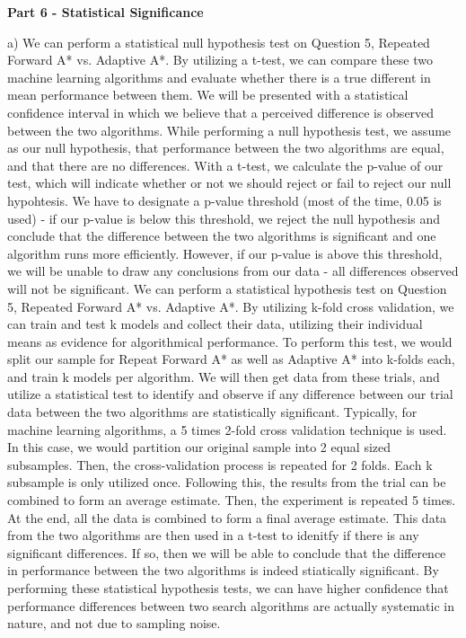 \documentclass[11pt]{article}
\begin{document}
    
    \begin{center}
        \Large
        \textbf{Part 6 - Statistical Significance}
    \end{center}
    a) 
    We can perform a statistical null hypothesis test on Question 5, Repeated Forward A* vs. Adaptive A*. By utilizing a t-test, we can compare these two machine learning algorithms and evaluate whether there is a true different in mean performance between them. We will be presented with a statistical confidence interval in which we believe that a perceived difference is observed between the two algorithms. While performing a null hypothesis test, we assume as our null hypothesis, that performance between the two algorithms are equal, and that there are no differences. With a t-test, we calculate the p-value of our test, which will indicate whether or not we should reject or fail to reject our null hypohtesis. We have to designate a p-value threshold (most of the time, 0.05 is used) - if our p-value is below this threshold, we reject the null hypothesis and conclude that the difference between the two algorithms is significant and one algorithm runs more efficiently. However, if our p-value is above this threshold, we will be unable to draw any conclusions from our data - all differences observed will not be significant. 
    We can perform a statistical hypothesis test on Question 5, Repeated Forward A* vs. Adaptive A*. By utilizing k-fold cross validation, we can train and test k models and collect their data, utilizing their individual means as evidence for algorithmical performance. To perform this test, we would split our sample for Repeat Forward A* as well as Adaptive A* into k-folds each, and train k models per algorithm. We will then get data from these trials, and utilize a statistical test to identify and observe if any difference between our trial data between the two algorithms are statistically significant. Typically, for machine learning algorithms, a 5 times 2-fold cross validation technique is used. In this case, we would partition our original sample into 2 equal sized subsamples. Then, the cross-validation process is repeated for 2 folds. Each k subsample is only utilized once. Following this, the results from the trial can be combined to form an average estimate. Then, the experiment is repeated 5 times. At the end, all the data is combined to form a final average estimate. This data from the two algorithms are then used in a t-test to idenitfy if there is any significant differences. If so, then we will be able to conclude that the difference in performance between the two algorithms is indeed stiatically significant. By performing these statistical hypothesis tests, we can have higher confidence that performance differences between two search algorithms are actually systematic in nature, and not due to sampling noise.
    
    
\end{document}
